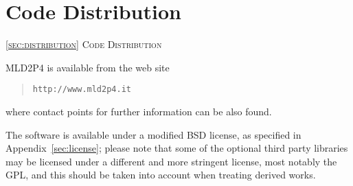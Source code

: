 \section{Code Distribution\label{sec:distribution}}
         {\textsc{\ref{sec:distribution} Code Distribution}}

\noindent
MLD2P4 is available from the web site 
\begin{quotation}
\texttt{http://www.mld2p4.it}
\end{quotation}
where contact points for further information can be also found.

The software is available under a modified BSD license, as specified
in Appendix~\ref{sec:license}; please note that some of the optional
third party libraries may be licensed under a different and more
stringent license, most notably the GPL, and this should be taken into
account when treating derived works. 

